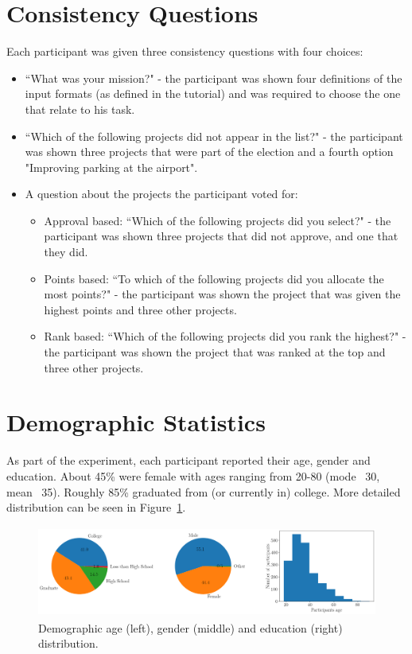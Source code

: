 \documentclass{comsoc2023}
\begin{document}
\section{Consistency Questions}\label{app:consis}
Each participant was given three consistency questions with four choices:
\begin{itemize}
    \item ``What was your mission?" - the participant was shown four definitions of the input formats (as defined in the tutorial) and was required to choose the one that relate to his task.
    \item ``Which of the following projects did not appear in the list?" - the participant was shown three projects that were part of the election and a fourth option "Improving parking at the airport". 
    \item A question about the projects the participant voted for:
    \begin{itemize}
        \item Approval based: ``Which of the following projects did you select?" - the participant was shown three projects that did not approve, and one that they did. 
        \item Points based: ``To which of the following projects did you allocate the most points?" - the participant was shown the project that was given the highest points and three other projects.
        \item Rank based: ``Which of the following projects did you rank the highest?" - the participant was shown the project that was ranked at the top and three other projects.
    \end{itemize}
\end{itemize}


\section{Demographic Statistics}\label{app:demographics}
As part of the experiment, each participant reported their age, gender and education. About 45\% were female with ages ranging from 20-80 (mode ~30, mean ~35). Roughly 85\% graduated from (or currently in) college. More detailed distribution can be seen in Figure~\ref{fig:distribution}.


\begin{figure}[!h]
\begin{center}
\includegraphics[width=13cm,height=3cm]{experiment/dists.png}
\caption{Demographic age (left), gender (middle) and education (right) distribution.
}\label{fig:distribution}
\end{center}
\end{figure}
\end{document}
